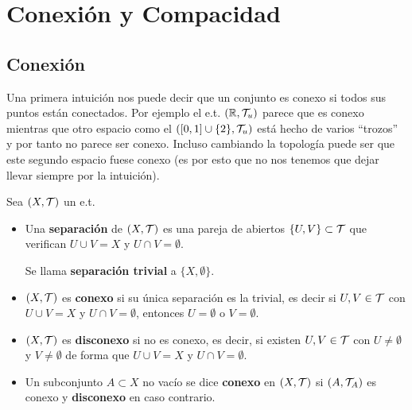 \chapter{Conexión y Compacidad}

\section{Conexión}
Una primera intuición nos puede decir que un conjunto es conexo si todos sus puntos están conectados. Por ejemplo el e.t. $(\mathbb{R}, \mathcal{T}_u)$ parece que es conexo mientras que otro espacio como el $([0,1]\cup\{2\}, \mathcal{T}_u)$ está hecho de varios ``trozos'' y por tanto no parece ser conexo. Incluso cambiando la topología puede ser que este segundo espacio fuese conexo (es por esto que no nos tenemos que dejar llevar siempre por la intuición).

\begin{definicion}
    Sea $(X, \mathcal{T})$ un e.t.
    \begin{itemize}
        \item Una \textbf{separación} de $(X, \mathcal{T})$ es una pareja de abiertos $\{U,V\}\subset \mathcal{T}$ que verifican $U\cup V = X$ y $U\cap V = \emptyset$.
        
        Se llama \textbf{separación trivial} a $\{X, \emptyset\}$.
        \item $(X, \mathcal{T})$ es \textbf{conexo} si su única separación es la trivial, es decir si $U,V\in \mathcal{T}$ con $U\cup V = X$ y $U\cap V = \emptyset$, entonces $U=\emptyset$ o $V=\emptyset$.
        \item $(X, \mathcal{T})$ es \textbf{disconexo} si no es conexo, es decir, si existen $U,V\in \mathcal{T}$ con $U\neq \emptyset$ y $V\neq \emptyset$ de forma que $U\cup V = X$ y $U\cap V = \emptyset$.
        \item Un subconjunto $A\subset X$ no vacío se dice \textbf{conexo} en $(X, \mathcal{T})$ si $(A, \mathcal{T}_A)$ es conexo y \textbf{disconexo} en caso contrario.
    \end{itemize}
    \endsquare
\end{definicion}

